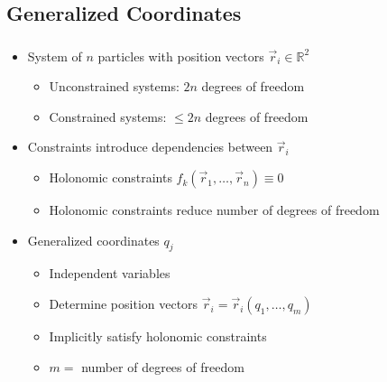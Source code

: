 \subsection{Generalized Coordinates}
\label{subsect:generalized-coordinates}

\begin{frame}
  \frametitle{\insertsubsection}
  \begin{itemize}
    \item System of ${n}$ particles with position vectors ${\vec{r}_i \in \mathbb{R}^2}$ \begin{itemize}
      \item Unconstrained systems: ${2n}$ degrees of freedom
      \item Constrained systems: ${\leq 2n}$ degrees of freedom
    \end{itemize}
    \item Constraints introduce dependencies between ${\vec{r}_i}$ \begin{itemize}
      \item Holonomic constraints ${f_k(\vec{r}_1, \ldots, \vec{r}_n) \stackrel{}{\equiv} 0}$
      \item Holonomic constraints reduce number of degrees of freedom
    \end{itemize}
    \item Generalized coordinates ${q_j}$ \begin{itemize}
      \item Independent variables
      \item Determine position vectors ${\vec{r}_i = \vec{r}_i(q_1, \ldots, q_m)}$
      \item Implicitly satisfy holonomic constraints
      \item ${m =}$ number of degrees of freedom
    \end{itemize}
  \end{itemize}
\end{frame}
